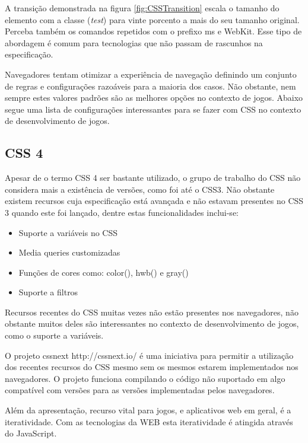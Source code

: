 A transição demonstrada na figura \ref{fig:CSSTransition} escala o
tamanho do elemento com a classe (\textit{test}) para vinte porcento a
mais do seu tamanho original. Perceba também os comandos repetidos com
o prefixo ms e WebKit. Esse tipo de abordagem é comum para tecnologias
que não passam de rascunhos na especificação.

Navegadores tentam otimizar a experiência de navegação definindo
um conjunto de regras e configurações razoáveis para a maioria dos
casos. Não obstante, nem sempre estes valores padrões são as melhores
opções no contexto de jogos. Abaixo segue uma lista de configurações
interessantes para se fazer com CSS no contexto de desenvolvimento de
jogos.

\subsection{CSS 4}

Apesar de o termo CSS 4 ser bastante utilizado, o grupo de trabalho do CSS
não considera mais a existência de versões, como foi até o CSS3.
Não obstante existem recursos cuja especificação está avançada e não estavam presentes
no CSS 3 quando este foi lançado, dentre estas funcionalidades inclui-se:

\begin{itemize}
\item Suporte a variáveis no CSS
\item Media queries customizadas
\item Funções de cores como: color(), hwb() e gray()
\item Suporte a filtros
\end{itemize}

Recursos recentes do CSS muitas vezes não estão presentes nos
navegadores, não obstante muitos deles são interessantes no contexto
de desenvolvimento de jogos, como o suporte a variáveis.

O projeto cssnext http://cssnext.io/ é uma iniciativa para permitir a
utilização dos recentes recursos do CSS mesmo sem os mesmos estarem
implementados nos navegadores. O projeto funciona compilando o código
não suportado em algo compatível com versões para as versões
implementadas pelos navegadores.

Além da apresentação, recurso vital para jogos, e aplicativos web em
geral, é a iteratividade. Com as tecnologias da WEB esta iteratividade
é atingida através do JavaScript.
